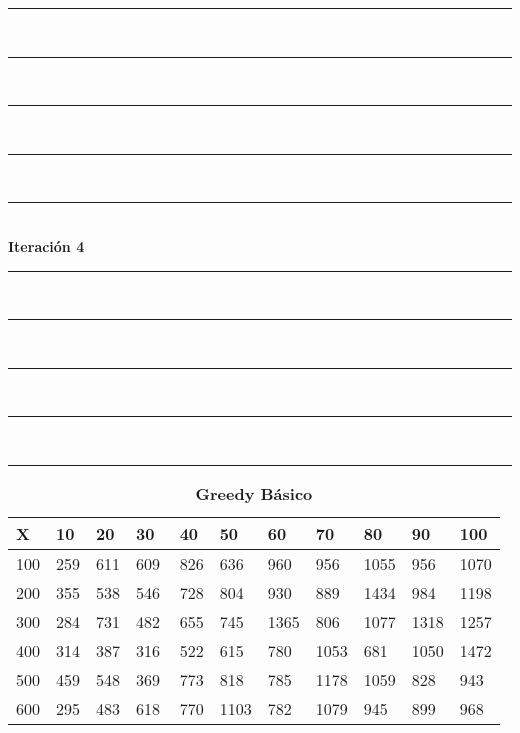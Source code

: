 \documentclass[10pt,letterpaper]{article}
\begin{document}
\newpage 
\begin{center}
\newcommand{\HRule}{\rule{\linewidth}{0.5mm}}
\center
\HRule\\[6cm]
\HRule\\[0.4cm]
\HRule\\[0.4cm]
\HRule\\[0.4cm]
\HRule\\[0.4cm]
{\centering \Huge\bfseries Iteración 4}\\[0.4cm]
\HRule\\[0.4cm]
\HRule\\[0.4cm]
\HRule\\[0.4cm]
\HRule\\[6cm]
\HRule
\end{center}
\newpage 
{}
\begin{center}
\begin{table}\renewcommand{\arraystretch}{2.5}
\caption{\large \textbf{Greedy Básico}}
\centering
\begin{tabular} { |m{0.5cm}|m{1.3cm}|m{1.3cm}|m{1.3cm}|m{1.3cm}|m{1.3cm}|m{1.3cm}|m{1.3cm}|m{1.3cm}|m{1.3cm}|m{1.3cm}|} 
\hline
\rowcolor{Gray}
\centering \textbf{X} & \centering \textbf{10} & \centering \textbf{20} & \centering \textbf{30}\ & \centering \textbf{40} & \centering \textbf{50} & \centering \textbf{60}\ & \centering \textbf{70} & \centering \textbf{80} & \centering \textbf{90}\ & \textbf{100} \\\hline
\cellcolor{Gray}100 & \Large 259 & \Large 611 & \Large 609 & \Large 826 & \Large 636 & \Large 960 & \Large 956 & \Large 1055 & \Large 956 & \Large 1070 \\
\hline
\cellcolor{Gray}200 & \Large 355 & \Large 538 & \Large 546 & \Large 728 & \Large 804 & \Large 930 & \Large 889 & \Large 1434 & \Large 984 & \Large 1198 \\
\hline
\cellcolor{Gray}300 & \Large 284 & \Large 731 & \Large 482 & \Large 655 & \Large 745 & \Large 1365 & \Large 806 & \Large 1077 & \Large 1318 & \Large 1257 \\
\hline
\cellcolor{Gray}400 & \Large 314 & \Large 387 & \Large 316 & \Large 522 & \Large 615 & \Large 780 & \Large 1053 & \Large 681 & \Large 1050 & \Large 1472 \\
\hline
\cellcolor{Gray}500 & \Large 459 & \Large 548 & \Large 369 & \Large 773 & \Large 818 & \Large 785 & \Large 1178 & \Large 1059 & \Large 828 & \Large 943 \\
\hline
\cellcolor{Gray}600 & \Large 295 & \Large 483 & \Large 618 & \Large 770 & \Large 1103 & \Large 782 & \Large 1079 & \Large 945 & \Large 899 & \Large 968 \\

\end{tabular}
\end{table}
\end{center}
\end{document}
